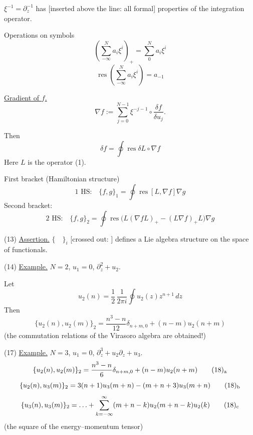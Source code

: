 $\xi^{-1}=\partial_z^{-1}$ has
[inserted above the line: all formal]
properties of the integration operator.

Operations on symbols
\begin{equation*}
\left(\sum_{-\infty}^{N}a_i\xi^i\right)_+
=\sum_{0}^{N}a_i\xi^i \tag{7}
\end{equation*}
\begin{equation*}
\operatorname{res}\left(\sum_{-\infty}^{N}a_i\xi^i\right)=a_{-1} \tag{8}
\end{equation*}

\underline{Gradient of $f$.}
\begin{equation*}
\nabla f:=\sum_{j=0}^{N-1}\xi^{-j-1}\circ\frac{\delta f}{\delta u_j}. \tag{9}
\end{equation*}

Then
\begin{equation*}
\delta f=\oint\operatorname{res}\delta L\circ\nabla f \tag{10}
\end{equation*}
Here $L$ is the operator (1).

First bracket (Hamiltonian structure)
\begin{equation*}
1\text{ HS:}\quad \{f,g\}_1=\oint\operatorname{res}[L,\nabla f]\nabla g \tag{11}
\end{equation*}
Second bracket:
\begin{equation*}
2\text{ HS:}\quad \{f,g\}_2=
\oint\operatorname{res}\bigl(L(\nabla f L)_+-(L\nabla f)_+L\bigr)\nabla g \tag{12}
\end{equation*}

(13) \underline{Assertion.} $\{\quad\}_i$
[crossed out: ]
defines a Lie algebra structure on the space of functionals.

(14) \underline{Example.} $N=2$, $u_1=0$, $\partial_z^2+u_2$.

Let
\begin{equation*}
u_2(n)=\frac12\,\frac{1}{2\pi i}\oint u_2(z)z^{n+1}\,dz \tag{15}
\end{equation*}
Then
\begin{equation*}
\{u_2(n),u_2(m)\}_2=\frac{n^3-n}{12}\delta_{n+m,0}+(n-m)u_2(n+m) \tag{16}
\end{equation*}
(the commutation relations of the Virasoro algebra are obtained!)

(17) \underline{Example.} $N=3$, $u_1=0$, $\partial_z^3+u_2\partial_z+u_3$.
\begin{equation*}
\{u_2(n),u_2(m)\}_2=\frac{n^3-n}{6}\delta_{n+m,0}+(n-m)u_2(n+m)
\tag*{$(18)_{\text{a}}$}
\end{equation*}
\begin{equation*}
\{u_2(n),u_3(m)\}_2=3(n+1)u_3(m+n)-(m+n+3)u_3(m+n)
\tag*{$(18)_{\text{b}}$}
\end{equation*}
\begin{equation*}
\{u_3(n),u_3(m)\}_2=\ldots+
\sum_{k=-\infty}^{\infty}(m+n-k)u_2(m+n-k)u_2(k)
\tag*{$(18)_{\text{c}}$}
\end{equation*}
(the square of the energy--momentum tensor)

